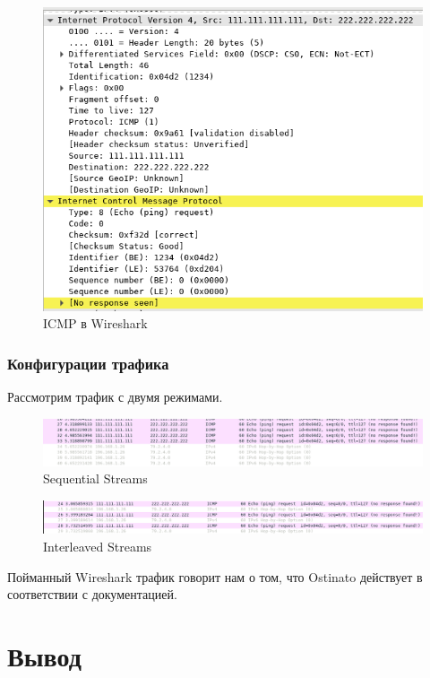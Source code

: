 \documentclass[12pt, a4paper] {ncc}
\begin{document}
	\begin{figure}[h!]
		\includegraphics[scale=0.4]{CapturedICMP.png}
		\caption{ICMP в Wireshark}
		\center
	\end{figure}

\subsubsection*{Конфигурации трафика}
	Рассмотрим трафик с двумя режимами.
	\begin{figure}[h!]
		\includegraphics[scale=0.4]{SeqB.png}
		\caption{Sequential Streams}
		\center
	\end{figure}

	\begin{figure}[h!]
		\includegraphics[scale=0.4]{InterleavedB.png}
		\caption{Interleaved Streams}
		\center
	\end{figure}

	Пойманный Wireshark трафик говорит нам о том, что Ostinato действует в соответствии с
	документацией.


\section*{Вывод}
\end{document}
